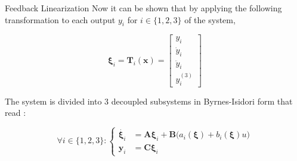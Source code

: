 \begin{frame}{Feedback Linearization}
    Now it can be shown that by applying the following transformation to each output \(y_i\) for \(i \in \{1, 2, 3\}\) of the system,

\begin{equation}
\boldsymbol{\xi}_i
=
\boldsymbol{T}_i(\boldsymbol{x})
=
\begin{bmatrix}
    y_i \\
    \dot{y}_i \\
    \ddot{y}_i \\
    y^{(3)}_i
\end{bmatrix}
\end{equation}

The system is divided into 3 decoupled subsystems in Byrnes-Isidori form that read : 

\begin{equation}
\label{eq:flat_sys_reduced}
\forall i \in \{1, 2, 3\} : 
\left\{
\begin{aligned}
  \dot{\boldsymbol{\xi}_i} &= \boldsymbol{A} \boldsymbol{\xi}_i + \boldsymbol{B} \big(a_i(\boldsymbol{\xi}) + b_i(\boldsymbol{\xi})u)\\
  \boldsymbol{y}_i &= \boldsymbol{C} \boldsymbol{\xi}_i 
\end{aligned}
\right.
\end{equation}
\end{frame}



